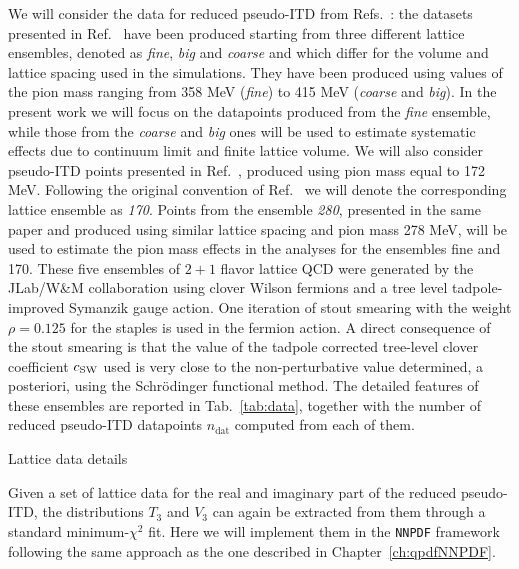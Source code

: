 %
We will consider the data for reduced pseudo-ITD from Refs.~\cite{Joo:2019jct, Joo:2020spy}:
the datasets presented in Ref.~\cite{Joo:2019jct} have been produced starting from three different lattice 
ensembles, denoted as \textit{fine}, \textit{big} and \textit{coarse} and which differ for the volume and lattice spacing 
used in the simulations. They have been produced using values of the pion mass ranging from 358 MeV (\textit{fine})
to 415 MeV (\textit{coarse} and \textit{big}). 
In the present work we will focus on the datapoints produced from the \textit{fine} ensemble, 
while those from the \textit{coarse} and \textit{big} ones will be used to estimate systematic effects due to continuum limit 
and finite lattice volume.
We will also consider pseudo-ITD points presented in Ref.~\cite{Joo:2020spy}, produced using pion mass equal to 172 MeV.
Following the original convention of Ref.~\cite{Joo:2020spy} we will denote the corresponding lattice ensemble as \textit{170}.
Points from the ensemble \textit{280}, presented in the same paper and produced using similar lattice spacing and pion mass 278 MeV,
will be used to estimate the pion mass effects in the analyses for the ensembles fine and 170.
%
These five ensembles of $2+1$ flavor lattice QCD were generated by the JLab/W\&M collaboration using clover Wilson fermions 
and a tree level tadpole-improved Symanzik gauge action. One iteration of stout smearing with the weight $ \rho = 0.125$ 
for the staples is used in the fermion action. 
A direct consequence of the stout smearing is that the value of the tadpole corrected tree-level clover coefficient $c_{\rm SW}$ 
used is very close to the non-perturbative value determined, a posteriori, using the Schr\"odinger functional method.
The detailed features of these ensembles are reported in Tab.~\ref{tab:data},
together with the number of reduced pseudo-ITD datapoints $n_{\text{dat}}$ computed from each of them.
\begin{table}[t]
	\renewcommand*{\arraystretch}{1.60}
	\scriptsize
	\centering
	
	\vspace{0.3cm}
	\caption{Lattice data details}
	\label{tab:data}
\end{table}

Given a set of lattice data for the real and imaginary part of the reduced pseudo-ITD, 
the distributions $T_3$ and $V_3$ can again be extracted from them through a standard minimum-$\chi^2$ fit.
Here we will implement them in the {\tt NNPDF} framework following the same approach as the one
described in Chapter~\ref{ch:qpdfNNPDF}.


